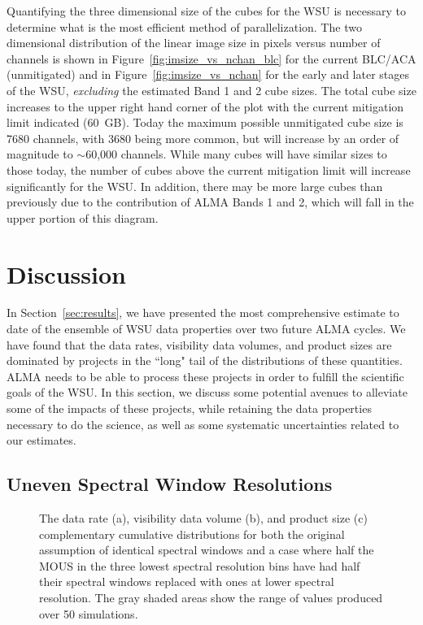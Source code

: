 \documentclass[preprint]{aastex631}
\begin{document}
 Quantifying the three dimensional size of the cubes for the WSU is necessary to determine what is the most efficient method of parallelization.  The two dimensional distribution of the linear image size in pixels versus number of channels is shown in Figure~\ref{fig:imsize_vs_nchan_blc} for the current BLC/ACA (unmitigated) and in Figure~\ref{fig:imsize_vs_nchan} for the early and later stages of the WSU, {\it excluding} the estimated Band 1 and 2 cube sizes. The total cube size increases to the upper right hand corner of the plot with the current mitigation limit indicated (60~GB).  Today the maximum possible unmitigated cube size is 7680 channels, with 3680 being more common, but will increase by an order of magnitude to $\sim$60,000 channels. While many cubes will have similar sizes to those today, the number of cubes above the current mitigation limit will increase significantly for the WSU. In addition, there may be more large cubes than previously due to the contribution of ALMA Bands 1 and 2, which will fall in the upper portion of this diagram. 


\section{Discussion} \label{sec:discussion}

In Section~\ref{sec:results}, we have presented the most comprehensive estimate to date of the ensemble of WSU data properties over two future ALMA cycles.  We have found that the data rates, visibility data volumes, and product sizes are dominated by projects in the ``long" tail of the distributions of these quantities. ALMA needs to be able to process these projects in order to fulfill the scientific goals of the WSU. In this section, we discuss some potential avenues to alleviate some of the impacts of these projects, while retaining the data properties necessary to do the science, as well as some systematic uncertainties related to our estimates.

\subsection{Uneven Spectral Window Resolutions} \label{sec:discussion_unevenspws}

\begin{figure}
    \caption{The data rate (a), visibility data volume (b), and product size (c) complementary cumulative distributions for both the original assumption of identical spectral windows and a case where half the MOUS in the three lowest spectral resolution bins have had half their spectral windows replaced with ones at lower spectral resolution. The gray shaded areas show the range of values produced over 50 simulations.}
    \label{fig:uneven_spw}
\end{figure}
\end{document}
